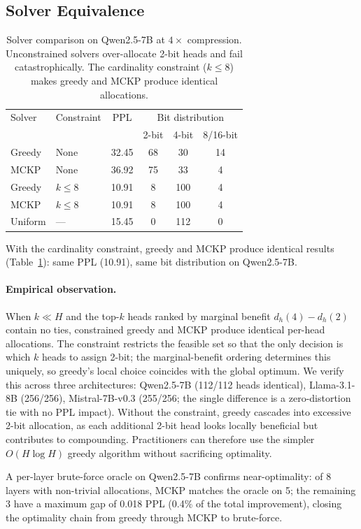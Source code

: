 \subsection{Solver Equivalence}
\label{sec:solver_equiv}

\begin{table}[t]
\centering
\small
\caption{Solver comparison on Qwen2.5-7B at $4\times$ compression. Unconstrained solvers over-allocate 2-bit heads and fail catastrophically. The cardinality constraint ($k{\leq}8$) makes greedy and MCKP produce identical allocations.\protect\footnotemark}
\label{tab:solver_equiv}
\begin{tabular}{llcccc}
\toprule
Solver & Constraint & PPL & \multicolumn{3}{c}{Bit distribution} \\
 & & & 2-bit & 4-bit & 8/16-bit \\
\midrule
Greedy & None & 32.45 & 68 & 30 & 14 \\
MCKP & None & 36.92 & 75 & 33 & 4 \\
Greedy & $k{\leq}8$ & 10.91 & 8 & 100 & 4 \\
MCKP & $k{\leq}8$ & 10.91 & 8 & 100 & 4 \\
Uniform & --- & 15.45 & 0 & 112 & 0 \\
\bottomrule
\end{tabular}
\end{table}

With the cardinality constraint, greedy and MCKP produce identical results (Table~\ref{tab:solver_equiv}): same PPL (10.91), same bit distribution on Qwen2.5-7B.

\paragraph{Empirical observation.}
When $k \ll H$ and the top-$k$ heads ranked by marginal benefit $d_h(4) - d_h(2)$ contain no ties, constrained greedy and MCKP produce identical per-head allocations.
The constraint restricts the feasible set so that the only decision is which $k$ heads to assign 2-bit; the marginal-benefit ordering determines this uniquely, so greedy's local choice coincides with the global optimum.
We verify this across three architectures: Qwen2.5-7B (112/112 heads identical), Llama-3.1-8B (256/256), Mistral-7B-v0.3 (255/256; the single difference is a zero-distortion tie with no PPL impact).
Without the constraint, greedy cascades into excessive 2-bit allocation, as each additional 2-bit head looks locally beneficial but contributes to compounding.
Practitioners can therefore use the simpler $O(H \log H)$ greedy algorithm without sacrificing optimality.

A per-layer brute-force oracle on Qwen2.5-7B confirms near-optimality: of 8 layers with non-trivial allocations, MCKP matches the oracle on 5; the remaining 3 have a maximum gap of 0.018 PPL (0.4\% of the total improvement), closing the optimality chain from greedy through MCKP to brute-force.
